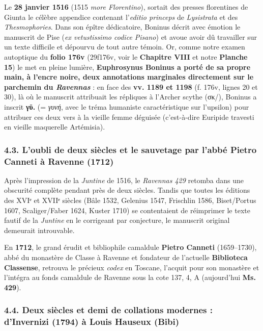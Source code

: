 \documentclass[11pt, a4paper, twoside]{article}
\renewcommand{\_}{\origunderscore\penalty0\relax}
\renewcommand{\texttt}[1]{#1}
\newcommand{\Bibi}{\textit{Bibi}}
\def\Bibi{Bibi}%
\begin{document}
Le \textbf{28 janvier 1516} (1515 \textit{more Florentino}), sortait des presses florentines de Giunta le célèbre appendice contenant l'\textit{editio princeps} de \textit{Lysistrata} et des \textit{Thesmophories}. Dans son épître dédicatoire, Boninus décrit avec émotion le manuscrit de Pise (\textit{ex vetustissimo codice Pisano}) et avoue avoir dû travailler sur un texte difficile et dépourvu de tout autre témoin.
Or, comme notre examen autoptique du \textbf{folio \texttt{176v}} (\texttt{29\_f176v}, voir le \textbf{Chapitre VIII} et notre \textbf{Planche 15}) le met en pleine lumière, \textbf{Euphrosynus Boninus a porté de sa propre main, à l'encre noire, deux annotations marginales directement sur le parchemin du \textit{Ravennas}} : en face des \textbf{vv. 1189 et 1198} (\texttt{f. 176v}, lignes 20 et 30), là où le manuscrit attribuait les répliques à l'Archer scythe (\texttt{σκ/}), Boninus a inscrit \textbf{\texttt{γϋ.}} (= \textit{γυνή}, avec le tréma humaniste caractéristique sur l'upsilon) pour attribuer ces deux vers à la vieille femme déguisée (c'est-à-dire Euripide travesti en vieille maquerelle Artémisia).


\subsubsection{4.3. L'oubli de deux siècles et le sauvetage par l'abbé Pietro Canneti à Ravenne (1712)}

Après l'impression de la \textit{Juntine} de 1516, le \textit{Ravennas 429} retomba dans une obscurité complète pendant près de deux siècles. Tandis que toutes les éditions des XVIᵉ et XVIIᵉ siècles (Bâle 1532, Gelenius 1547, Frischlin 1586, Biset/Portus 1607, Scaliger/Faber 1624, Kuster 1710) se contentaient de réimprimer le texte fautif de la \textit{Juntine} en le corrigeant par conjecture, le manuscrit original demeurait introuvable.

En \textbf{1712}, le grand érudit et bibliophile camaldule \textbf{Pietro Canneti} (1659–1730), abbé du monastère de Classe à Ravenne et fondateur de l'actuelle \textbf{Biblioteca Classense}, retrouva le précieux \textit{codex} en Toscane, l'acquit pour son monastère et l'intégra au fonds camaldule de Ravenne sous la cote \texttt{137, 4, A} (aujourd'hui \textbf{Ms. 429}).


\subsubsection{4.4. Deux siècles et demi de collations modernes : d'Invernizi (1794) à Louis Hauseux (\Bibi{})}
\end{document}
